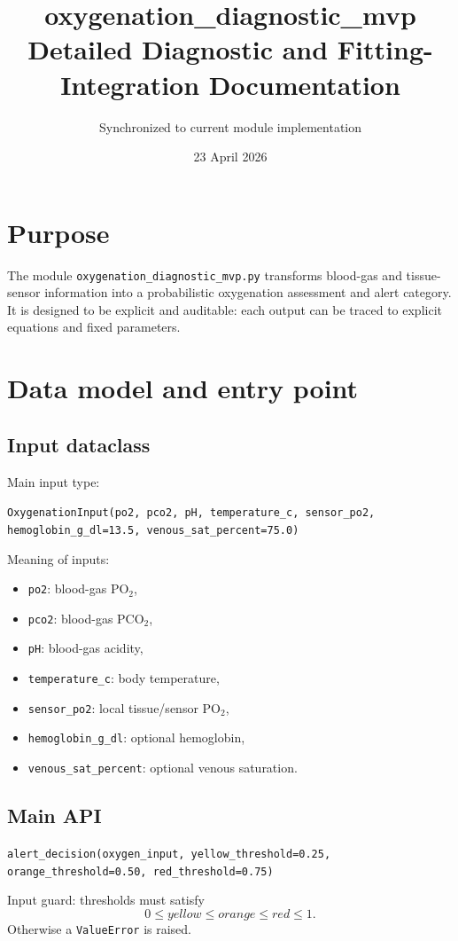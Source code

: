 \documentclass[12pt,a4paper]{article}
\title{oxygenation\_diagnostic\_mvp\\Detailed Diagnostic and Fitting-Integration Documentation}
\author{Synchronized to current module implementation}
\date{23 April 2026}
\begin{document}
\sloppy
\maketitle
\tableofcontents
\newpage

\section{Purpose}
The module \texttt{oxygenation\_diagnostic\_mvp.py} transforms blood-gas and tissue-sensor information into a probabilistic oxygenation assessment and alert category. It is designed to be explicit and auditable: each output can be traced to explicit equations and fixed parameters.

\section{Data model and entry point}
\subsection{Input dataclass}
Main input type:
\begin{center}
\texttt{OxygenationInput(po2, pco2, pH, temperature\_c, sensor\_po2, hemoglobin\_g\_dl=13.5, venous\_sat\_percent=75.0)}
\end{center}

Meaning of inputs:
\begin{itemize}
    \item \texttt{po2}: blood-gas PO$_2$,
    \item \texttt{pco2}: blood-gas PCO$_2$,
    \item \texttt{pH}: blood-gas acidity,
    \item \texttt{temperature\_c}: body temperature,
    \item \texttt{sensor\_po2}: local tissue/sensor PO$_2$,
    \item \texttt{hemoglobin\_g\_dl}: optional hemoglobin,
    \item \texttt{venous\_sat\_percent}: optional venous saturation.
\end{itemize}

\subsection{Main API}
\texttt{alert\_decision(oxygen\_input, yellow\_threshold=0.25, orange\_threshold=0.50, red\_threshold=0.75)}

Input guard: thresholds must satisfy
\[
0 \leq yellow \leq orange \leq red \leq 1.
\]
Otherwise a \texttt{ValueError} is raised.
\end{document}
